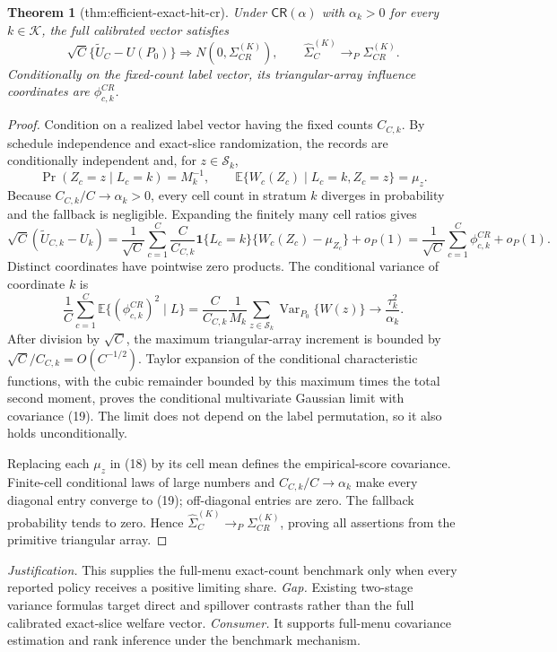 \documentclass{article}
\newtheorem{theorem}{Theorem}
\begin{document}
\begin{theorem}[thm:efficient-exact-hit-cr]\label{thm:efficient-exact-hit-cr}
Under \(\mathsf{CR}(\alpha)\) with \(\alpha_k>0\) for every \(k\in\mathcal K\), the full calibrated vector satisfies \[\sqrt C\{\widetilde U_C-U(P_0)\}\Rightarrow N(0,\Sigma_{CR}^{(K)}),\qquad \widehat\Sigma_C^{(K)}\to_P\Sigma_{CR}^{(K)}.\] Conditionally on the fixed-count label vector, its triangular-array influence coordinates are \(\phi_{c,k}^{CR}\).
\end{theorem}
\begin{proof}
Condition on a realized label vector having the fixed counts \(C_{C,k}\).  By schedule independence and exact-slice randomization, the records are conditionally independent and, for \(z\in\mathcal S_k\),
\[
 \Pr(Z_c=z\mid L_c=k)=M_k^{-1},\qquad
 \mathbb E\{W_c(Z_c)\mid L_c=k,Z_c=z\}=\mu_z. \tag{17}
\]
Because \(C_{C,k}/C\to\alpha_k>0\), every cell count in stratum \(k\) diverges in probability and the fallback is negligible.  Expanding the finitely many cell ratios gives
\[
 \sqrt C(\widetilde U_{C,k}-U_k)
 =\frac1{\sqrt C}\sum_{c=1}^C\frac{C}{C_{C,k}}\mathbf1\{L_c=k\}
 \{W_c(Z_c)-\mu_{Z_c}\}+o_P(1)
 =\frac1{\sqrt C}\sum_{c=1}^C\phi_{c,k}^{CR}+o_P(1). \tag{18}
\]
Distinct coordinates have pointwise zero products.  The conditional variance of coordinate \(k\) is
\[
 \frac1C\sum_{c=1}^C\mathbb E\{(\phi_{c,k}^{CR})^2\mid L\}
 =\frac{C}{C_{C,k}}\frac1{M_k}\sum_{z\in\mathcal S_k}
 \operatorname{Var}_{P_0}\{W(z)\}
 \longrightarrow\frac{\tau_k^2}{\alpha_k}. \tag{19}
\]
After division by \(\sqrt C\), the maximum triangular-array increment is bounded by \(\sqrt C/C_{C,k}=O(C^{-1/2})\).  Taylor expansion of the conditional characteristic functions, with the cubic remainder bounded by this maximum times the total second moment, proves the conditional multivariate Gaussian limit with covariance (19).  The limit does not depend on the label permutation, so it also holds unconditionally.

Replacing each \(\mu_z\) in (18) by its cell mean defines the empirical-score covariance.  Finite-cell conditional laws of large numbers and \(C_{C,k}/C\to\alpha_k\) make every diagonal entry converge to (19); off-diagonal entries are zero.  The fallback probability tends to zero.  Hence \(\widehat\Sigma_C^{(K)}\to_P\Sigma_{CR}^{(K)}\), proving all assertions from the primitive triangular array.
\end{proof}
\par\smallskip\noindent \textit{Justification.} This supplies the full-menu exact-count benchmark only when every reported policy receives a positive limiting share. \textit{Gap.} Existing two-stage variance formulas target direct and spillover contrasts rather than the full calibrated exact-slice welfare vector. \textit{Consumer.} It supports full-menu covariance estimation and rank inference under the benchmark mechanism.
\end{document}
